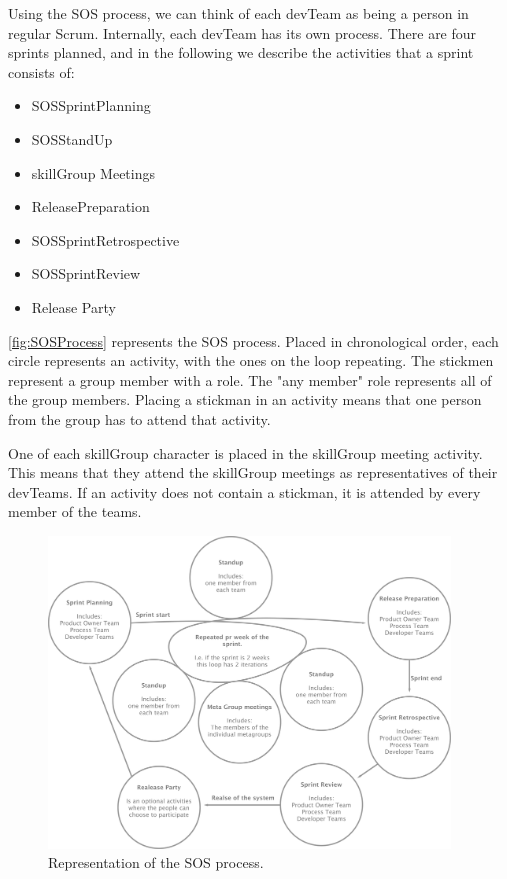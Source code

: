 Using the \gls{SOS} process, we can think of each \gls{devTeam} as being a person in regular Scrum. Internally, each \gls{devTeam} has its own process. There are four sprints planned, and in the following we describe the activities that a sprint consists of:

\begin{itemize}
    \item \Gls{SOSSprintPlanning}
    \item \Gls{SOSStandUp}
    \item \Gls{skillGroup} Meetings
    \item \Gls{ReleasePreparation}
    \item \Gls{SOSSprintRetrospective}
    \item \Gls{SOSSprintReview}
    \item Release Party
\end{itemize}

\autoref{fig:SOSProcess} represents the SOS process. Placed in chronological order, each circle represents an activity, with the ones on the loop repeating. The stickmen represent a group member with a role. The "any member" role represents all of the group members. Placing a stickman in an activity means that one person from the group has to attend that activity.

One of each \gls{skillGroup} character is placed in the \gls{skillGroup} meeting activity. This means that they attend the \gls{skillGroup} meetings as representatives of their \glspl{devTeam}. If an activity does not contain a stickman, it is attended by every member of the teams.

\begin{figure}[h]
    \begin{center}
        \includegraphics[width=0.95\textwidth]{figures/SOSProcessFigure.pdf}
    \end{center}
    \caption{Representation of the \gls{SOS} process.}
    \label{fig:SOSProcess}
\end{figure}

